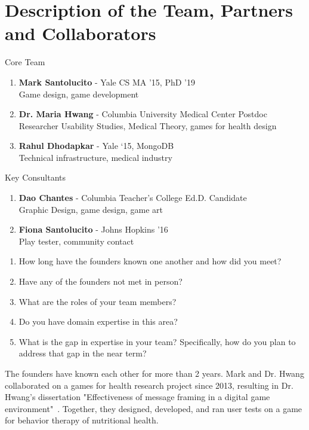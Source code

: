 \section{Description of the Team, Partners and Collaborators}

Core Team

\begin{enumerate}
\item \textbf{Mark Santolucito} - Yale CS MA '15, PhD '19\\
    Game design, game development

\item \textbf{Dr. Maria Hwang} - Columbia University Medical Center Postdoc Researcher
	Usability Studies, Medical Theory, games for health design

\item \textbf{Rahul Dhodapkar} - Yale ‘15, MongoDB\\
	Technical infrastructure, medical industry
\end{enumerate}

Key Consultants

\begin{enumerate}
\item \textbf{Dao Chantes} - Columbia Teacher’s College Ed.D. Candidate\\
	Graphic Design, game design, game art

\item \textbf{Fiona Santolucito} - Johns Hopkins '16\\
	Play tester, community contact

\end{enumerate}

\begin{enumerate}
\itemsep-0.5em 

    \item How long have the founders known one another and how did you meet?
    \item Have any of the founders not met in person?
    \item What are the roles of your team members?
    \item Do you have domain expertise in this area?
    \item What is the gap in expertise in your team? Specifically, how do you plan to address that gap in the near term?
\end{enumerate}

The founders have known each other for more than 2 years. Mark and Dr. Hwang collaborated on a games for health research project since 2013, resulting in Dr. Hwang's dissertation "Effectiveness of message framing in a digital game environment"~\cite{hwang2016}. Together, they designed, developed, and ran user tests on a game for behavior therapy of nutritional health.

